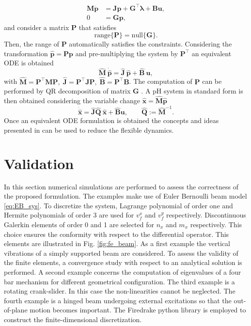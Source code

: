 \documentclass{svjour3}                     %
\newcommand{\secondRev}[1]{\textcolor{blue!80!black}{#1}}
\begin{document}
\begin{equation}
\begin{aligned}
\mathbf{M} \dot{\mathbf{p}} &=  \mathbf{J}\mathbf{p} + \mathbf{G}^\top \bm{\lambda} + \mathbf{B}\mathbf{u}, \\ 
0 &= \mathbf{G}\mathbf{p},
\end{aligned}
\end{equation}
and consider a matrix $\mathbf{P}$ that satisfies 
\[
\mathrm{range}\{\mathbf{P}\} = \mathrm{null}\{\mathbf{G}\}.
\]
Then, the range of $\mathbf{P}$ automatically satisfies the constraints. Considering the transformation $\widehat{\mathbf{p}} = \mathbf{P} \mathbf{p}$ and pre-multiplying the system by $\mathbf{P}^\top$ an equivalent ODE is obtained
\[
\widehat{\mathbf{M}} \ \dot{\widehat{\mathbf{p}}} =  \widehat{\mathbf{J}} \ \widehat{\mathbf{p}} + \widehat{\mathbf{B}} \ \mathbf{u},
\]
with $\widehat{\mathbf{M}} = \mathbf{P}^\top \mathbf{M} \mathbf{P}, \; \widehat{\mathbf{J}} = \mathbf{P}^\top \mathbf{J} \mathbf{P}, \; \widehat{\mathbf{B}} = \mathbf{P}^\top \mathbf{B}$. The computation of $\mathbf{P}$ can be performed by QR decomposition of matrix $\mathbf{G}$ \cite{nullspaceFlMult}. A pH system in standard form is then obtained considering the variable change $\widehat{\mathbf{x}} = \widehat{\mathbf{M}} \widehat{\mathbf{p}}$
\[ \dot{\widehat{\mathbf{x}}} =  \widehat{\mathbf{J}} \widehat{\mathbf{Q}}\ \widehat{\mathbf{x}} + \widehat{\mathbf{B}}  \mathbf{u}, \qquad \widehat{\mathbf{Q}}:= \widehat{\mathbf{M}}^{-1}.
\] 
Once an equivalent ODE formulation is obtained the concepts and ideas presented in \cite{phode_red} can be used to reduce the flexible dynamics.

\section{Validation}
\label{sec:valid}
In this section numerical simulations are performed to assess the correctness of the proposed formulation. \secondRev{The examples make use of Euler Bernoulli beam model \eqref{eq:EB_sys}. To discretize the system, Lagrange polynomial of order one and Hermite polynomials of order 3 are used for $v_f^x$ and $v_f^y$ respectively. Discontinuous Galerkin elements of order 0 and 1 are selected for $n_x$ and $m_{x}$ respectively. This choice ensures the conformity with respect to the differential operator. This elements are illustrated in Fig. \ref{fig:fe_beam}. As a first example the vertical vibrations of a simply supported beam are considered. To assess the validity of the finite elements, a convergence study with respect to an analytical solution is performed}. A \secondRev{second} example concerns the computation of eigenvalues of a four bar \secondRev{mechanism} for different geometrical configuration. The \secondRev{third} example is a rotating crank-slider. In this case the non-linearities cannot be neglected. The \secondRev{fourth} example is a hinged beam undergoing external excitations so that the out-of-plane motion becomes important.  The Firedrake python library \cite{rathgeber2017firedrake} is employed to construct the finite-dimensional discretization.  
\end{document}
